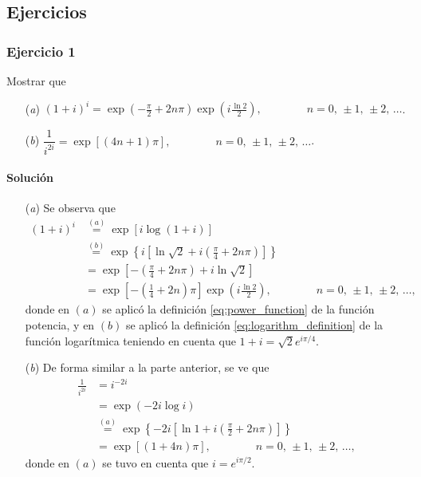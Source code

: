 \documentclass[a4paper]{report}
\begin{document}
\subsection*{Ejercicios}

\subsubsection{Ejercicio 1}

Mostrar que 
\begin{enumerate}
 \item[(\textit{a})] \(\displaystyle (1+i)^i=\exp\left(-\frac{\pi}{2}+2n\pi\right)\exp\left(i\frac{\ln2}{2}\right),\qquad\qquad n=0,\,\pm1,\,\pm2,\,\dots\). 
 \item[(\textit{b})] \(\displaystyle \dfrac{1}{i^{2i}}=\exp[(4n+1)\pi],\qquad\qquad n=0,\,\pm1,\,\pm2,\,\dots\). 
\end{enumerate}

\paragraph{Solución} 

\begin{enumerate}
 \item[(\textit{a})] Se observa que 
 \begin{align*}
  (1+i)^i&\overset{(a)}{=}\exp\left[i\log(1+i)\right]\\
   &\overset{(b)}{=}\exp\left\{i\left[\ln\sqrt{2}+i\left(\frac{\pi}{4}+2n\pi\right)\right]\right\}\\
   &=\exp\left[-\left(\frac{\pi}{4}+2n\pi\right)+i\ln\sqrt{2}\right]\\
   &=\exp\left[-\left(\frac{1}{4}+2n\right)\pi\right]\exp\left(i\frac{\ln2}{2}\right),
   \qquad\qquad n=0,\,\pm1,\,\pm2,\,\dots,
 \end{align*}
 donde en \((a)\) se aplicó la definición \ref{eq:power_function} de la función potencia, y en \((b)\) se aplicó la definición \ref{eq:logarithm_definition} de la función logarítmica teniendo en cuenta que \(1+i=\sqrt{2}e^{i\pi/4}\). 
 \item[(\textit{b})] De forma similar a la parte anterior, se ve que
 \begin{align*}
  \frac{1}{i^{2i}}&=i^{-2i}\\
   &=\exp\left(-2i\log i\right)\\
   &\overset{(a)}{=}\exp\left\{-2i\left[\ln1+i\left(\frac{\pi}{2}+2n\pi\right)\right]\right\}\\
   &=\exp\left[(1+4n)\pi\right],
   \qquad\qquad n=0,\,\pm1,\,\pm2,\,\dots,
 \end{align*}
 donde en \((a)\) se tuvo en cuenta que \(i=e^{i\pi/2}\).
\end{enumerate}
\end{document}
